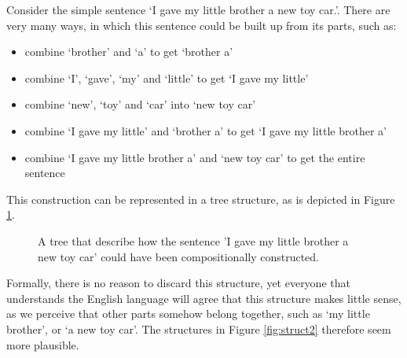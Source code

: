 \documentclass{report}
\theoremstyle{break}
\begin{document}
Consider the simple sentence `I gave my little brother a new toy car.'. There are very many ways, in which this sentence could be built up from its parts, such as:\begin{itemize}
\item combine `brother' and `a' to get `brother a'
\item combine `I', `gave', `my' and `little' to get `I gave my little'
\item combine `new', `toy' and `car' into `new toy car'
\item combine `I gave my little' and `brother a' to get `I gave my little brother a'
\item combine `I gave my little brother a' and `new toy car' to get the entire sentence
\end{itemize}

This construction can be represented in a tree structure, as is depicted in Figure \ref{fig:struct1}.

\begin{figure}[!ht]
\centering
{}
\caption{A tree that describe how the sentence 'I gave my little brother a new toy car' could have been compositionally constructed.}\label{fig:struct1}
\end{figure}

Formally, there is no reason to discard this structure, yet everyone that understands the English language will agree that this structure makes little sense, as we perceive that other parts somehow belong together, such as `my little brother', or `a new toy car'. The structures in Figure \ref{fig:struct2} therefore seem more plausible.
\end{document}
